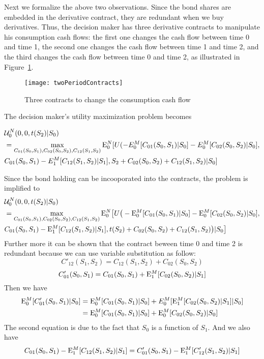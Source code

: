 Next we formalize the above two observations. Since the bond shares are embedded in the derivative contract, they are redundant when we buy derivatives. Thus, the decision maker has three derivative contracts to manipulate his consumption cash flows: the first one changes the cash flow between time 0 and time 1, the second one changes the cash flow between time 1 and time 2,  and the third changes the cash flow between time 0 and time 2, as illustrated in Figure~\ref{fig:twoPeriodContracts}.   
\begin{figure}
\texttt{[image: twoPeriodContracts]}\newline
\caption{Three contracts to change the consumption cash flow}%
\label{fig:twoPeriodContracts}%
\end{figure}
The decision maker's utility maximization problem becomes

\begin{align*}
&\mathcal{U}^N_0 (0,0, t( S_2)|S_0) \\&= \max_{ C_{01}(S_0,S_1), C_{02}(S_0,S_2), C_{12}(S_1,S_2)} \mathrm{E}_0^N [U( - E_0^M[C_{01}(S_0,S_1)|S_0] - E_0^M[C_{02}(S_0,S_2)|S_0], \\&  C_{01}(S_0,S_1) - E_1^M[C_{12}(S_1,S_2)|S_1],  S_2+ C_{02}(S_0,S_2)+C_{12}(S_1,S_2) |S_0]
\end{align*}

Since the bond holding can be incooporated into the contracts, the problem is implified to
\begin{align*}
&\mathcal{U}^N_0 (0,0, t(S_2)|S_0) \\&= \max_{C_{01}(S_0,S_1), C_{02}(S_0,S_2), C_{12}(S_1,S_2)} \mathrm{E}_0^N \big{[}U\big{(} - \mathrm{E}_0^M[C_{01}(S_0,S_1)|S_0] - \mathrm{E}_0^M[C_{02}(S_0,S_2)|S_0], \\&C_{01}(S_0,S_1) - \mathrm{E}_1^M[C_{12}(S_1,S_2)|S_1], t(S_2)+ C_{02}(S_0,S_2)+C_{12}(S_1,S_2)\big{)} |S_0\big{]}
\end{align*}
Further more it can be shown that the contract beween time 0 and time 2 is redundant because we can use variable substitution as follow:
\[ C'_{12}(S_1,S_2) = C_{12}(S_1,S_2) + C_{02}(S_0,S_2) \]
\[C'_{01}(S_0,S_1) = C_{01}(S_0,S_1) + \mathrm{E}_1^M[C_{02}(S_0,S_2)|S_1] \]
Then we have
\begin{align*}
\mathrm{E}_0^M[C'_{01}(S_0,S_1)|S_0] &=  \mathrm{E}_0^M[C_{01}(S_0,S_1)|S_0] + E_0^M[\mathrm{E}_1^M[C_{02}(S_0,S_2)|S_1]|S_0] \\
& = \mathrm{E}_0^M[C_{01}(S_0,S_1)|S_0] +\mathrm{E}_0^M[C_{02}(S_0,S_2)|S_0] 
\end{align*}
The second equation is due to the fact that $S_0$ is a function of $S_1$.  And we also have
\[C_{01}(S_0,S_1) - \mathrm{E}_1^M[C_{12}(S_1,S_2)|S_1] = C'_{01}(S_0,S_1) - \mathrm{E}_1^M[C'_{12}(S_1,S_2)|S_1]\]

